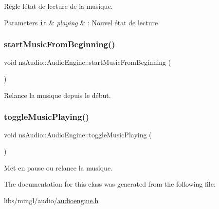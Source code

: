 Règle l\textquotesingle{}état de lecture de la musique. 


\begin{DoxyParams}[1]{Parameters}
\mbox{\tt in}  & {\em playing} & \+: Nouvel état de lecture \\
\hline
\end{DoxyParams}
\mbox{\label{classns_audio_1_1_audio_engine_ac1343ed3afe38eb80a222969f3d74d6d}} 
\subsubsection{\texorpdfstring{start\+Music\+From\+Beginning()}{startMusicFromBeginning()}}
{\footnotesize\ttfamily void ns\+Audio\+::\+Audio\+Engine\+::start\+Music\+From\+Beginning (\begin{DoxyParamCaption}{ }\end{DoxyParamCaption})}



Relance la musique depuis le début. 

\mbox{\label{classns_audio_1_1_audio_engine_aba89263fc9f810bee40dcae229313883}} 
\subsubsection{\texorpdfstring{toggle\+Music\+Playing()}{toggleMusicPlaying()}}
{\footnotesize\ttfamily void ns\+Audio\+::\+Audio\+Engine\+::toggle\+Music\+Playing (\begin{DoxyParamCaption}{ }\end{DoxyParamCaption})}



Met en pause ou relance la musique. 



The documentation for this class was generated from the following file\+:\begin{DoxyCompactItemize}
\item 
libs/mingl/audio/\hyperlink{audioengine_8h}{audioengine.\+h}\end{DoxyCompactItemize}
